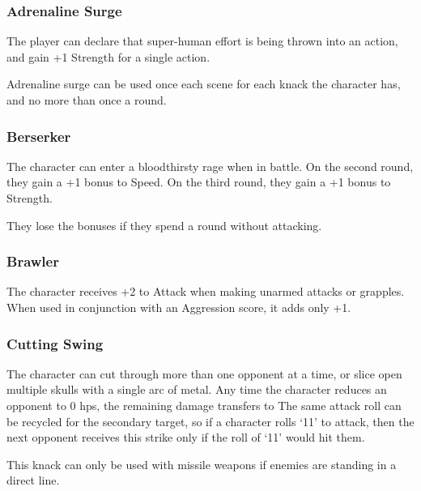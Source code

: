 \begin{multicols}{2}

\subsubsection{Adrenaline Surge}
\label{adrenalinesurge}

The player can declare that super-human effort is being thrown into an action, and gain +1 Strength for a single action.

Adrenaline surge can be used once each scene for each knack the character has, and no more than once a \gls{round}.

\subsubsection{Berserker}

The character can enter a bloodthirsty rage when in battle.
On the second round, they gain a +1 bonus to Speed.
On the third round, they gain a +1 bonus to Strength.

They lose the bonuses if they spend a round without attacking.

\subsubsection{Brawler}

The character receives +2 to Attack when making unarmed attacks or grapples.
When used in conjunction with an Aggression score, it adds only +1.

\subsubsection{Cutting Swing}

The character can cut through more than one opponent at a time, or slice open multiple skulls with a single arc of metal.
Any time the character reduces an opponent to 0 \glspl{hp}, the remaining damage transfers to
\iftoggle{verbose}{%
  any other opponent in range as the weapon slices across multiple throats, stomachs, and limbs.
  This process recurs until either no damage or no enemies remain.

}{the next viable target.}
The same attack roll can be recycled for the secondary target, so if a character rolls `11' to attack, then the next opponent receives this strike only if the roll of `11' would hit them.

This knack can only be used with missile weapons if enemies are standing in a direct line.


\end{multicols}
